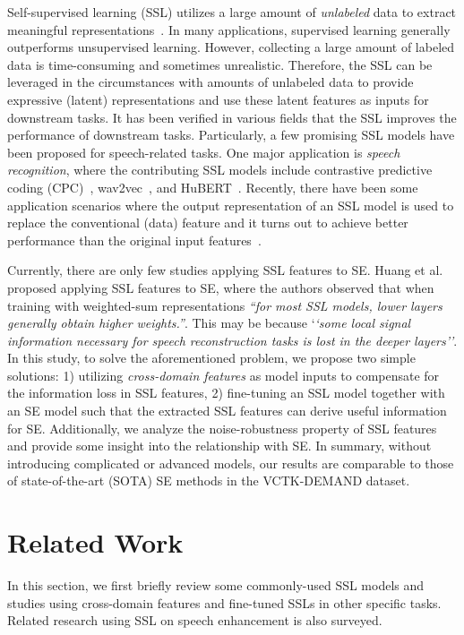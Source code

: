 \documentclass[a4paper]{article}
\begin{document}
Self-supervised learning (SSL) utilizes a large amount of \textit{unlabeled} data to extract meaningful representations~\cite{liu2022audio}. In many applications, supervised learning generally outperforms unsupervised learning. However, collecting a large amount of labeled data is time-consuming and sometimes unrealistic. Therefore, the SSL can be leveraged in the circumstances with amounts of unlabeled data to provide expressive (latent) representations and use these latent features as inputs for downstream tasks. It has been verified in various fields that the SSL improves the performance of downstream tasks. Particularly, a few promising SSL models have been proposed for speech-related tasks. One major application is \textit{speech recognition}, where the contributing SSL models include contrastive predictive coding (CPC)~\cite{oord2018representation}, wav2vec~\cite{schneider2019wav2vec}, and HuBERT~\cite{hsu2021hubert}. Recently, there have been some application scenarios where the output representation of an SSL model is used to replace the conventional (data) feature and it turns out to achieve better performance than the original input features~\cite{wang2021fine,cooper2022generalization,nguyen2020investigating}. 


Currently, there are only few studies applying SSL features to SE. Huang et al.~\cite{ZiliSSL} proposed applying SSL features to SE, where the authors observed that when training with weighted-sum representations \emph{``for most SSL models, lower layers generally obtain higher weights.''}. This may be because `\emph{`some local signal information necessary for speech reconstruction tasks is lost in the deeper layers''}. In this study, to solve the aforementioned problem, we propose two simple solutions: 1) utilizing \textit{cross-domain features} as model inputs to compensate for the information loss in SSL features, 2) fine-tuning an SSL model together with an SE model such that the extracted SSL features can derive useful information for SE. Additionally, we analyze the noise-robustness property of SSL features and provide some insight into the relationship with SE. In summary, without introducing complicated or advanced models, our results are comparable to those of state-of-the-art (SOTA) SE methods in the VCTK-DEMAND dataset.



\section{Related Work}
In this section, we first briefly review some commonly-used SSL models and studies using cross-domain features and fine-tuned SSLs in other specific tasks. Related research using SSL on speech enhancement is also surveyed.
\end{document}
